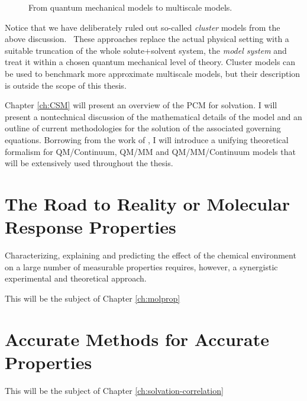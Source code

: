 \begin{figure}[tb]
\caption{From quantum mechanical models to multiscale models.}
\label{fig:qm-to-multiscale}
\end{figure}

Notice that we have deliberately ruled out so-called \emph{cluster}
models from the above discussion.~\autocite{ClusterModels}
These approaches replace the actual physical setting with a suitable
truncation of the whole solute+solvent system, the \emph{model system}
and treat it within a chosen quantum mechanical level of theory.
Cluster models can be used to benchmark more approximate multiscale
models, but their description is outside the scope of this thesis.

Chapter \ref{ch:CSM} will present an overview of the \ac{PCM} for
solvation.
I will present a nontechnical discussion of the mathematical details of
the model and an outline of current methodologies for the solution of
the associated governing equations.
Borrowing from the work of \citeauthor{Lipparini2010-be},\autocite{Lipparini2010-be,
Lipparini2015-lq} I will introduce a unifying theoretical formalism for
\acs{QM}/Continuum, \acs{QM}/\acs{MM} and \acs{QM}/\acs{MM}/Continuum models that will
be extensively used throughout the thesis.

\section*{The Road to Reality or Molecular Response Properties}

Characterizing, explaining and predicting the effect of the chemical
environment on a large number of measurable properties requires,
however, a synergistic experimental and theoretical approach.

This will be the subject of Chapter \ref{ch:molprop}

\section*{Accurate Methods for Accurate Properties}

This will be the subject of Chapter \ref{ch:solvation-correlation}
